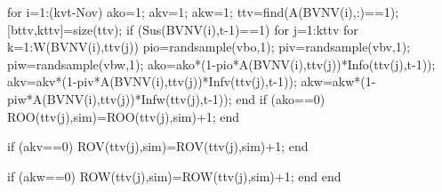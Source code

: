                                     for i=1:(kvt-Nov)                                         
                                          ako=1;
                                          akv=1;
                                          akw=1;
                                          ttv=find(A(BVNV(i),:)==1);    
                                          [bttv,kttv]=size(ttv);
                                          if (Sus(BVNV(i),t-1)==1)                                                    
                                                    for j=1:kttv                                                                                                  
                                                          for k=1:W(BVNV(i),ttv(j))                                                                                                                              
                                                                pio=randsample(vbo,1);
                                                                piv=randsample(vbv,1);
                                                                piw=randsample(vbw,1);
                                                                ako=ako*(1-pio*A(BVNV(i),ttv(j))*Info(ttv(j),t-1));
                                                                akv=akv*(1-piv*A(BVNV(i),ttv(j))*Infv(ttv(j),t-1));
                                                                akw=akw*(1-piw*A(BVNV(i),ttv(j))*Infw(ttv(j),t-1));                                                                 
                                                          end
                                                          if (ako==0)
                                                             ROO(ttv(j),sim)=ROO(ttv(j),sim)+1;
                                                          end
                                                          
                                                          if (akv==0)
                                                             ROV(ttv(j),sim)=ROV(ttv(j),sim)+1;
                                                          end
                                                          
                                                          if (akw==0)
                                                             ROW(ttv(j),sim)=ROW(ttv(j),sim)+1;
                                                          end
                                                    end
                                                     
